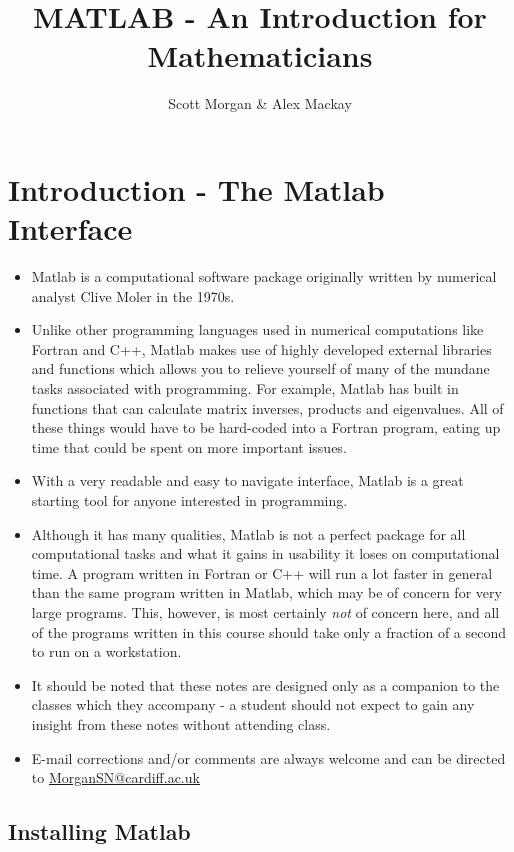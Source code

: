 \documentclass[12pt]{report}
\title{MATLAB - An Introduction for Mathematicians}
\author{Scott Morgan \& Alex Mackay}
\begin{document}
\maketitle

\section*{Introduction - The Matlab Interface}

\begin{itemize}
\item Matlab is a computational software package originally written by numerical analyst Clive Moler in the 1970s. 
\item Unlike other programming languages used in numerical computations like Fortran and C++, Matlab makes use of highly developed external libraries and functions which allows you to relieve yourself of many of the mundane tasks associated with programming. For example, Matlab has built in functions that can calculate matrix inverses, products and eigenvalues. All of these things would have to be hard-coded into a Fortran program, eating up time that could be spent on more important issues. 
\item With a very readable and easy to navigate interface, Matlab is a great starting tool for anyone interested in programming. 
\item Although it has many qualities, Matlab is not a perfect package for all computational tasks and what it gains in usability it loses on computational time. A program written in Fortran or C++ will run a lot faster in general than the same program written in Matlab, which may be of concern for very large programs. This, however, is most certainly \textit{not} of concern here, and all of the programs written in this course should take only a fraction of a second to run on a workstation.
\item It should be noted that these notes are designed only as a companion to the classes which they accompany - a student should not expect to gain any insight from these notes without attending class.
\item E-mail corrections and/or comments are always welcome and can be directed to \url{MorganSN@cardiff.ac.uk}
\end{itemize}


\subsection*{Installing Matlab}
\end{document}
